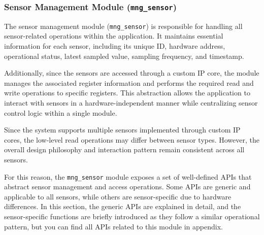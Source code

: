 \documentclass{article}
\begin{document}
\subsubsection{Sensor Management Module (\texttt{mng\_sensor})}
The sensor management module (\texttt{mng\_sensor}) is responsible for handling all 
sensor-related operations within the application. It maintains essential information 
for each sensor, including its unique ID, hardware address, operational status, latest 
sampled value, sampling frequency, and timestamp.

Additionally, since the sensors are accessed through a custom IP core, the module manages 
the associated register information and performs the required read and write operations 
to specific registers. This abstraction allows the application to interact with sensors 
in a hardware-independent manner while centralizing sensor control logic within a single 
module.

Since the system supports multiple sensors implemented through custom IP cores, the 
low-level read operations may differ between sensor types. However, the overall design 
philosophy and interaction pattern remain consistent across all sensors.

For this reason, the \texttt{mng\_sensor} module exposes a set of well-defined APIs 
that abstract sensor management and access operations. Some APIs are generic and 
applicable to all sensors, while others are sensor-specific due to hardware differences. 
In this section, the generic APIs are explained in detail, and the sensor-specific 
functions are briefly introduced as they follow a similar operational pattern, but you can find all APIs related to this module in appendix.
\end{document}
